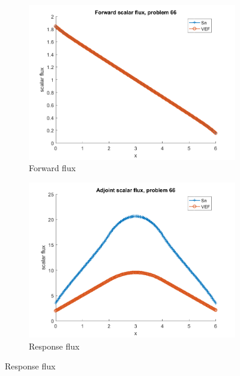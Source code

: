 \documentclass{article}
\begin{document}
\begin{figure}[H]
\label{Case66Flux}
\centering
\begin{subfigure}{.5\textwidth}
  \centering
  \includegraphics[width=.98\linewidth]{IanProposal/figures2/66phi.png}
  \caption{Forward flux}
  \label{fig:sfig1}
\end{subfigure}%
\begin{subfigure}{.5\textwidth}
  \centering
  \includegraphics[width=.98\linewidth]{IanProposal/figures2/66phia.png}
  \caption{Response flux}
  \label{fig:sfig4}
\end{subfigure}%
\end{figure}
\end{document}
